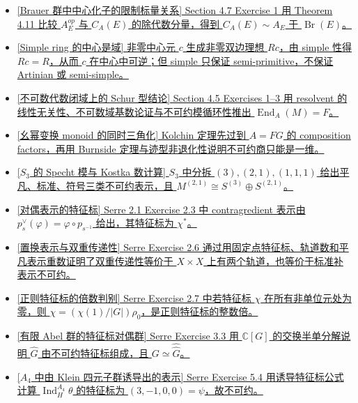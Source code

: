 \documentclass[a4paper]{ctexart}
\theoremstyle{definition}
\theoremstyle{analysis}
\theoremstyle{plain}
\begin{document}
\begin{itemize}
  \item \hyperref[subsec:problem-brauer-centralizer-restriction]{[Brauer 群中中心化子的限制标量关系] Section 4.7 Exercise 1 用 Theorem 4.11 比较 \(A_E^{op}\) 与 \(C_A(E)\) 的除代数分量，得到 \(C_A(E)\sim A_E\) 于 \(\operatorname{Br}(E)\)。}
  \item \hyperref[subsec:problem-center-simple-ring-field]{[Simple ring 的中心是域] 非零中心元 \(c\) 生成非零双边理想 \(Rc\)，由 simple 性得 \(Rc=R\)，从而 \(c\) 在中心中可逆；但 simple 只保证 semi-primitive，不保证 Artinian 或 semi-simple。}
  \item \hyperref[subsec:problem-schur-uncountable-field]{[不可数代数闭域上的 Schur 型结论] Section 4.5 Exercises 1--3 用 resolvent 的线性无关性、不可数域基数论证与不可约模循环性推出 \(\operatorname{End}_A(M)=F\)。}
  \item \hyperref[subsec:problem-kolchin-unipotent-monoid]{[幺幂变换 monoid 的同时三角化] Kolchin 定理先过到 \(A=FG\) 的 composition factors，再用 Burnside 定理与迹型非退化性说明不可约商只能是一维。}
  \item \hyperref[subsec:problem-s3-specht-kostka]{[\(S_3\) 的 Specht 模与 Kostka 数计算] \(S_3\) 中分拆 \((3),(2,1),(1,1,1)\) 给出平凡、标准、符号三类不可约表示，且 \(M^{(2,1)}\cong S^{(3)}\oplus S^{(2,1)}\)。}
  \item \hyperref[subsec:problem-serre-contragredient-character]{[对偶表示的特征标] Serre 2.1 Exercise 2.3 中 contragredient 表示由 \(p^\vee_s(\varphi)=\varphi\circ p_{s^{-1}}\) 给出，其特征标为 \(\chi^*\)。}
  \item \hyperref[subsec:problem-serre-permutation-double-transitive]{[置换表示与双重传递性] Serre Exercise 2.6 通过用固定点特征标、轨道数和平凡表示重数证明了双重传递性等价于 \(X\times X\) 上有两个轨道，也等价于标准补表示不可约。}
  \item \hyperref[subsec:problem-serre-regular-character-multiple]{[正则特征标的倍数判别] Serre Exercise 2.7 中若特征标 \(\chi\) 在所有非单位元处为零，则 \(\chi=(\chi(1)/|G|)\rho_0\)，是正则特征标的整数倍。}
  \item \hyperref[subsec:problem-serre-abelian-dual-character]{[有限 Abel 群的特征标对偶群] Serre Exercise 3.3 用 \(\mathbb C[G]\) 的交换半单分解说明 \(\widehat G\) 由不可约特征标组成，且 \(G\simeq\widehat{\widehat G}\)。}
  \item \hyperref[subsec:problem-serre-a4-induced-klein]{[\(A_4\) 中由 Klein 四元子群诱导出的表示] Serre Exercise 5.4 用诱导特征标公式计算 \(\operatorname{Ind}_H^{A_4}\theta\) 的特征标为 \((3,-1,0,0)=\psi\)，故不可约。}

\end{itemize}
\end{document}
